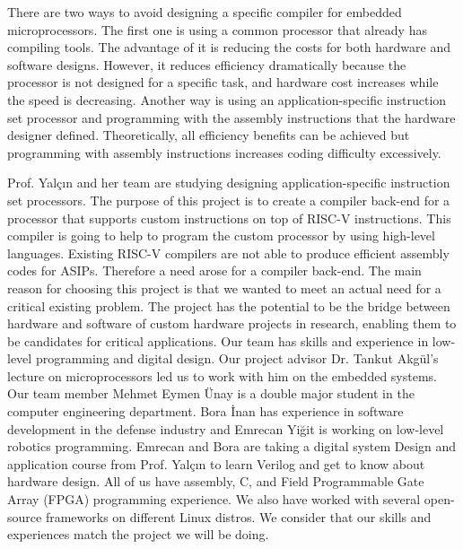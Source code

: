 There are two ways to avoid designing a specific compiler for embedded microprocessors. The first one is using a common processor that already has compiling tools. The advantage of it is reducing the costs for both hardware and software designs. However, it reduces efficiency dramatically because the processor is not designed for a specific task, and hardware cost increases while the speed is decreasing. Another way is using an application-specific instruction set processor and programming with the assembly instructions that the hardware designer defined. Theoretically, all efficiency benefits can be achieved but programming with assembly instructions increases coding difficulty excessively.

Prof. Yalçın and her team are studying designing application-specific instruction set processors. The purpose of this project is to create a compiler back-end for a processor that supports custom instructions on top of RISC-V instructions. This compiler is going to help to program the custom processor by using high-level languages. Existing RISC-V compilers are not able to produce efficient assembly codes for ASIPs. Therefore a need arose for a compiler back-end.
The main reason for choosing this project is that we wanted to meet an actual need for a critical existing problem. The project has the potential to be the bridge between hardware and software of custom hardware projects in research, enabling them to be candidates for critical applications. Our team has skills and experience in low-level programming and digital design. Our project advisor Dr. Tankut Akgül’s lecture on microprocessors led us to work with him on the embedded systems. Our team member Mehmet Eymen Ünay is a double major student in the computer engineering department. Bora İnan has experience in software development in the defense industry and Emrecan Yiğit is working on low-level robotics programming. Emrecan and Bora are taking a digital system Design and application course from Prof. Yalçın to learn Verilog and get to know about hardware design. All of us have assembly, C, and Field Programmable Gate Array (FPGA) programming experience. We also have worked with several open-source frameworks on different Linux distros. We consider that our skills and experiences match the project we will be doing.


